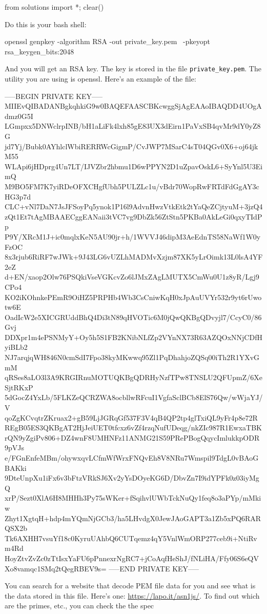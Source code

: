 \begin{python0}
from solutions import *; clear()
\end{python0}


  Do this is your bash shell:
  \begin{console}
openssl genpkey -algorithm RSA -out private_key.pem \
    -pkeyopt rsa_keygen_bits:2048
\end{console}
And you will get an RSA key. The key is stored in the file \verb!private_key.pem!.
The utility you are using is openssl.
Here's an example of the file:
{\scriptsize
\begin{console}
-----BEGIN PRIVATE KEY-----
MIIEvQIBADANBgkqhkiG9w0BAQEFAASCBKcwggSjAgEAAoIBAQDD4UOgAdmz0G5I
LGmpxx5DNWclrpINB/bH1aLiFk4lxh85gE83UX3dEirn1PaVxSB4qvMr9dY0yZ8G
jd7Yj/Bubk0AYhlclWbiRERRWcGigmP/CvJWP7MSarC4sT04QGv0X6+oj64jkM55
WLApi6jHDprg4Un7LT/IJVZbr2hbmu1D6wPPYN2D1uZpavOskL6+SyYnl5U3EimQ
M9BO5FM7K7yiRDeOFXCHgfUbh5PULZLc1u/vBdr70WopRwFRTdFdGgAY3cHG3p7d
CLC+vNl7DaN7JsJFSoyPq5ynok1P16l9AdvnHwzVtkEtk2tYaQeZCjtyuM+3jzQ4
zQt1Et7tAgMBAAECggEANaii3tVC7vg9DbZk56ZtStn5PKBa0AkLeGi0qxyTIdPp
P9Y/XRcM1J+ic0mqlxKeN5AU90jr+h/1WVVJ46dipM3AeEdnTS58NaWf1W0yFzOC
8x3rjub6RiRF7wJWk+9J43LG6vUZLhMADMvXzjm87XK5yLrOimk13L0lsA4YF2eZ
d+EN/xaop2Olw76PSQkiVseVGKcvZo6lJMxZAgLMUTX5CmWu0U1z8yR/Lgj9CPo4
KO2iKOhnkePEmR9OiHZ5PRPHb4Wb3CsCniwKqH0xJpAuUVYr532r9yt6rUwotw6E
OadIcW2e5XICGRUddBhQ4Di3tN89qHVOTic6M0jQwQKBgQDvyjl7/CcyC0/86Gvj
DDXpr1m4ePSNMyY+Oy5h5S1FB2KNibNLfZp2VYnNX73R63AZQOxNNjCDfHyiBLb2
NJ7arqjqWH846N0cmSdI7Fpo38kyMKwwq95Zl1PqDhahjoZQSq00iTh2R1YXvGmM
qRSes8aLO3l3A9KRGIRnuMOTUQKBgQDRHyNzfTPw8TNSLU2QFUpmZ/6XeSjtRKxP
5dGocZ4YxLb/5FLKZeQCRZWA8ocbllwRFcuI1VgfaSclBCb8ElS76Qw/wWjaYJ/V
qoZgKCvqtrZKruax2+gB59LjJGRqGf537F3V4qB4QP2tp4glTxiQL9yFr4p8e72R
REgB05ES3QKBgAT2HjJeiUET0tfcxz6vZf4rzqNufUDeqg/nkZIc987R1EwxaTBK
rQN9yZgiPv806+DZ4wnF8UMHNFz11ANMG21S59PRePBogQqycImlukkpODR9pVJs
e/FGnEnfeMBm/ohywxqvLCfmWfWrxFNQvEh8V8NRu7Wmspil9TdgL0vBAoGBAKki
9DteUnpXu1iFx6v3bFtzVRkSJ6Xv2yYsDOyeKG6D/DbvZn7I9idYPFk0z03iyMgQ
xrP/Sezt0XlA6H8MHHh3Py75sWKer+fSqihvlUWbTckNuQy1feq8o3aPYp/mMkiw
Zhyt1XgtqH+hdp4mYQmNjGCb3/ha5LHvdgX0JewJAoGAPT3a1Zb5xPQ6RARQSX2b
Tk6AXHH7vsuYf18c0KyruUAhbQ6CUTqemz4qY5VnlWmORP277ceb9i+NtiRvm4Rd
HoyZtvZvZc0zTtIsxYaFU6pPnnexrNgRC7+jCoAqfHeShJ/fNLiHA/Ffy06S6eQV
Xo8vamqc1SMq2tQegRBEV9s=
-----END PRIVATE KEY-----
\end{console}
}
You can search for a website that decode PEM file data for you
and see what is the data stored in this file.
Here's one: \url{https://lapo.it/asn1js/}.
To find out which are the primes, etc., you can check the the spec
